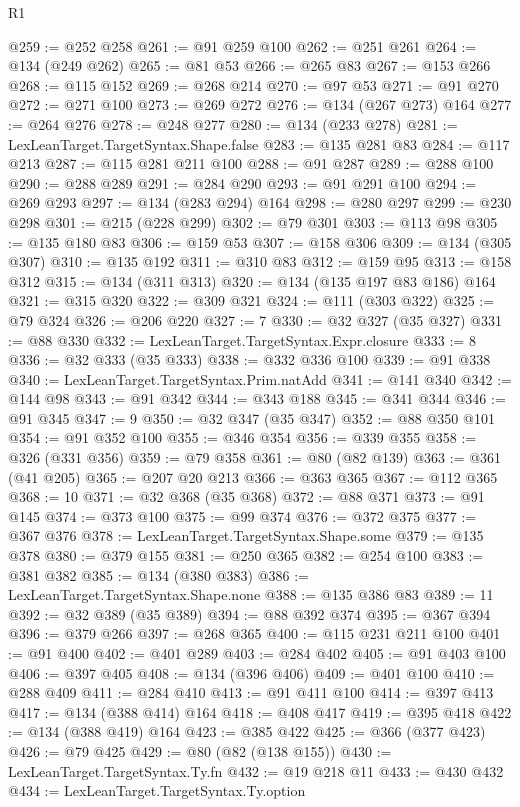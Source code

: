 \begin{lexlean}{R1}
\begin{coremodule}
{{{{{{{{{{{{{{{{{{{{{{{{{{{{{{{{{{{{{{{{{{{{{{{{{{{{{{{{{@259 := @252 @258
@261 := @91 @259 @100
@262 := @251 @261
@264 := @134 (@249 @262)
@265 := @81 @53
@266 := @265 @83
@267 := @153 @266
@268 := @115 @152
@269 := @268 @214
@270 := @97 @53
@271 := @91 @270
@272 := @271 @100
@273 := @269 @272
@276 := @134 (@267 @273) @164
@277 := @264 @276
@278 := @248 @277
@280 := @134 (@233 @278)
@281 := LexLeanTarget.TargetSyntax.Shape.false
@283 := @135 @281 @83
@284 := @117 @213
@287 := @115 @281 @211 @100
@288 := @91 @287
@289 := @288 @100
@290 := @288 @289
@291 := @284 @290
@293 := @91 @291 @100
@294 := @269 @293
@297 := @134 (@283 @294) @164
@298 := @280 @297
@299 := @230 @298
@301 := @215 (@228 @299)
@302 := @79 @301
@303 := @113 @98
@305 := @135 @180 @83
@306 := @159 @53
@307 := @158 @306
@309 := @134 (@305 @307)
@310 := @135 @192
@311 := @310 @83
@312 := @159 @95
@313 := @158 @312
@315 := @134 (@311 @313)
@320 := @134 (@135 @197 @83 @186) @164
@321 := @315 @320
@322 := @309 @321
@324 := @111 (@303 @322)
@325 := @79 @324
@326 := @206 @220
@327 := 7
@330 := @32 @327 (@35 @327)
@331 := @88 @330
@332 := LexLeanTarget.TargetSyntax.Expr.closure
@333 := 8
@336 := @32 @333 (@35 @333)
@338 := @332 @336 @100
@339 := @91 @338
@340 := LexLeanTarget.TargetSyntax.Prim.natAdd
@341 := @141 @340
@342 := @144 @98
@343 := @91 @342
@344 := @343 @188
@345 := @341 @344
@346 := @91 @345
@347 := 9
@350 := @32 @347 (@35 @347)
@352 := @88 @350 @101
@354 := @91 @352 @100
@355 := @346 @354
@356 := @339 @355
@358 := @326 (@331 @356)
@359 := @79 @358
@361 := @80 (@82 @139)
@363 := @361 (@41 @205)
@365 := @207 @20 @213
@366 := @363 @365
@367 := @112 @365
@368 := 10
@371 := @32 @368 (@35 @368)
@372 := @88 @371
@373 := @91 @145
@374 := @373 @100
@375 := @99 @374
@376 := @372 @375
@377 := @367 @376
@378 := LexLeanTarget.TargetSyntax.Shape.some
@379 := @135 @378
@380 := @379 @155
@381 := @250 @365
@382 := @254 @100
@383 := @381 @382
@385 := @134 (@380 @383)
@386 := LexLeanTarget.TargetSyntax.Shape.none
@388 := @135 @386 @83
@389 := 11
@392 := @32 @389 (@35 @389)
@394 := @88 @392 @374
@395 := @367 @394
@396 := @379 @266
@397 := @268 @365
@400 := @115 @231 @211 @100
@401 := @91 @400
@402 := @401 @289
@403 := @284 @402
@405 := @91 @403 @100
@406 := @397 @405
@408 := @134 (@396 @406)
@409 := @401 @100
@410 := @288 @409
@411 := @284 @410
@413 := @91 @411 @100
@414 := @397 @413
@417 := @134 (@388 @414) @164
@418 := @408 @417
@419 := @395 @418
@422 := @134 (@388 @419) @164
@423 := @385 @422
@425 := @366 (@377 @423)
@426 := @79 @425
@429 := @80 (@82 (@138 @155))
@430 := LexLeanTarget.TargetSyntax.Ty.fn
@432 := @19 @218 @11
@433 := @430 @432
@434 := LexLeanTarget.TargetSyntax.Ty.option
}}}}}}}}}}}}}}}}}}}}}}}}}}}}}}}}}}}}}}}}}}}}}}}}}}}}}}}}}
\end{coremodule}
\end{lexlean}
